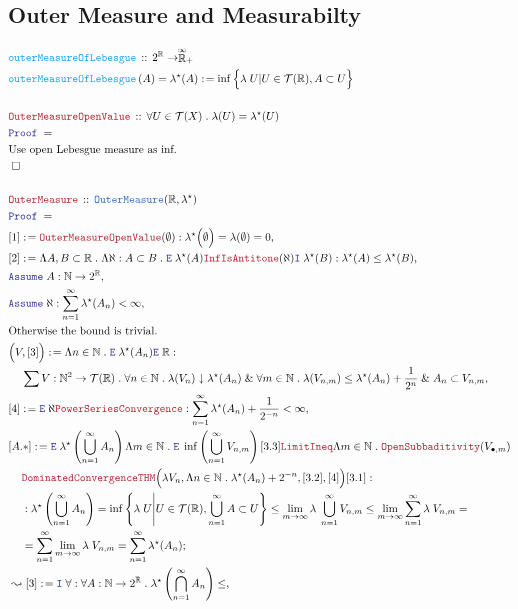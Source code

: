 \documentclass[12pt]{scrartcl}
\newcommand{\TYPE}[1]{\textcolor{NavyBlue}{\mathtt{#1}}}
\newcommand{\FUNC}[1]{\textcolor{Cerulean}{\mathtt{#1}}}
\newcommand{\LOGIC}[1]{\textcolor{Blue}{\mathtt{#1}}}
\newcommand{\THM}[1]{\textcolor{Maroon}{\mathtt{#1}}}
\renewcommand{\.}{\; . \;}
\newcommand{\de}{: \kern 0.1pc =}
\newcommand{\Act}[1]{\left( #1 \right)}
\newcommand{\Theorem}[2]{& \THM{#1} \, :: \, #2 \\ & \Proof = \\ }
\newcommand{\DeclareFunc}[2]{& \FUNC{#1} \, :: \, #2 \\}
\newcommand{\DefineNamedFunc}[4]{&  \FUNC{#1}\Act{#2} = #3 \de #4 \\}
\newcommand{\NewLine}{\\ & \kern 1pc}
\newcommand{\Page}[1]{ \begin{align*} #1 \end{align*}   }
\renewcommand{\And}{\; \& \;}
\newcommand{\Reals}{\mathbb{R} }
\newcommand{\Nat}{\mathbb{N} }
\newcommand{\EReals}{\stackrel{\mathclap{\infty}}{\mathbb{R}}}
\newcommand{\Say}[3]{& #1 \de #2 : #3, \\}
\newcommand{\Conclude}[3]{& #1 \de #2 : #3; \\}
\newcommand{\Derive}[3]{& \leadsto #1 \de #2 : #3, \\}
\newcommand{\Assume}[2]{& \LOGIC{Assume} \;#1 : #2, \\}
\newcommand{\QED}{\; \square}
\newcommand{\EndProof}{& \QED \\}
\newcommand{\Proof}{\LOGIC{Proof} \; }
\newcommand{\Elim}{\LOGIC{E} \; }
\newcommand{\Intro}{\LOGIC{I} \;}
\newcommand{\Explain}[1]{& \text{#1.} \\}
\newcommand{\T}{\mathcal{T}}
\newcommand{\OM}{\TYPE{OuterMeasure}}
\begin{document}
\subsection{Outer Measure and Measurabilty}
\Page{
	\DeclareFunc{outerMeasureOfLebesgue}
	{2^\Reals \to \EReals_+ }
	\DefineNamedFunc{outerMeasureOfLebesgue}
	{A}{ \lambda^\star(A) }{
		\inf \Big\{  \lambda\;U | U \in \T(\Reals), A \subset U  \Big\}	
	}
	\\
	\Theorem{OuterMeasureOpenValue}
	{
		\forall U \in \T(X) \.
		\lambda(U) = \lambda^\star(U)
	}
	\Explain{Use open Lebesgue measure as inf}
	\EndProof
	\\
	\Theorem{OuterMeasure}
	{
		\OM(\Reals,\lambda^\star)
	}
	\Say{[1]}{\THM{OuterMeasureOpenValue}(\emptyset)}
	{
		\lambda^\star\Big(\emptyset\Big) = \lambda(\emptyset) = 0
	}
	\Say{[2]}{
		\Lambda A,B \subset \Reals \. 
		\Lambda \aleph : A \subset B \. 
		\Elim  \lambda^\star(A)
		\THM{InfIsAntitone}(\aleph) 
		\Intro \lambda^\star(B)
	}{
		\lambda^\star(A) \le \lambda^\star(B)
	}
	\Assume{A}{\Nat \to 2^\Reals}
	\Assume{\aleph}
	{
		\sum^\infty_{n=1} \lambda^\star(A_n) < \infty
	}
	\Explain{Otherwise the bound is trivial}
	\Say{\Big( V, [3]\Big)}{\Lambda n \in \Nat \. \Elim \lambda^\star(A_n) \Elim \Reals}
	{
		\NewLine 	
		\sum V : \Nat^2 \to \T(\Reals) \. 
		\forall n \in \Nat \. \lambda(V_n) \downarrow \lambda^\star(A_n) 
		\And
		\forall m \in \Nat \. \lambda(V_{n,m}) \le \lambda^\star(A_n) + \frac{1}{2^{n}} \And
		A_{n} \subset V_{n,m}
	}
	\Say{[4]}{ \Elim \aleph \THM{PowerSeriesConvergence}}
	{
		 \sum^\infty_{n=1}  \lambda^\star(A_n) + \frac{1}{2^{-n}} < \infty
	}
	\Conclude{[A.*]}{
	        \Elim \lambda^\star\left( \bigcup^\infty_{n=1} A_n \right) 
	        \Lambda m \in \Nat \. \Elim \inf\left( \bigcup^\infty_{n=1}  V_{n,m} \right) [3.3]
	        \THM{LimitIneq}
	        \Lambda m \in \Nat \. \THM{OpenSubbaditivity}(V_{\bullet,m})
	        \NewLine
	        \THM{DominatedConvergenceTHM}\Big( 
	        	\lambda V_n, 
	        	\Lambda n \in \Nat \. \lambda^\star(A_n) + 2^{-n} , [3.2], [4] \Big)
	        [3.1]
	}	
	{
		\NewLine :		
		\lambda^\star\left( \bigcup^\infty_{n=1} A_n \right) = 
		\inf \left\{  \lambda\;U \Bigg| U \in \T(\Reals),  \bigcup_{n=1}^\infty A \subset U  \right\}  \le
		 \lim_{m \to \infty}  \lambda\;\bigcup^\infty_{n=1}  V_{n,m} \le 
		 \lim_{m \to \infty} \sum^\infty_{n=1} \lambda \; V_{n,m} = \NewLine =
		 \sum^\infty_{n=1} \lim_{m \to \infty} \lambda \; V_{n,m} =
		 \sum^\infty_{n=1} \lambda^\star(A_n)
	}
	\Derive{[3]}{\Intro \forall}
	{
		\forall A : \Nat \to 2^\Reals \.
		\lambda^\star\left( \bigcap^\infty_{n=1} A_n \right) \le 
}}
\end{document}
